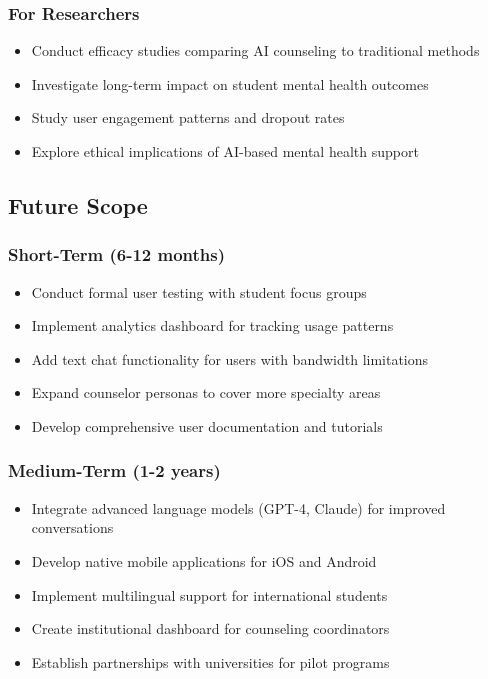 \documentclass[11pt,a4paper]{article}
\begin{document}
\subsubsection{For Researchers}
\begin{itemize}
    \item Conduct efficacy studies comparing AI counseling to traditional methods
    \item Investigate long-term impact on student mental health outcomes
    \item Study user engagement patterns and dropout rates
    \item Explore ethical implications of AI-based mental health support
\end{itemize}

\subsection{Future Scope}

\subsubsection{Short-Term (6-12 months)}
\begin{itemize}
    \item Conduct formal user testing with student focus groups
    \item Implement analytics dashboard for tracking usage patterns
    \item Add text chat functionality for users with bandwidth limitations
    \item Expand counselor personas to cover more specialty areas
    \item Develop comprehensive user documentation and tutorials
\end{itemize}

\subsubsection{Medium-Term (1-2 years)}
\begin{itemize}
    \item Integrate advanced language models (GPT-4, Claude) for improved conversations
    \item Develop native mobile applications for iOS and Android
    \item Implement multilingual support for international students
    \item Create institutional dashboard for counseling coordinators
    \item Establish partnerships with universities for pilot programs
\end{itemize}
\end{document}
